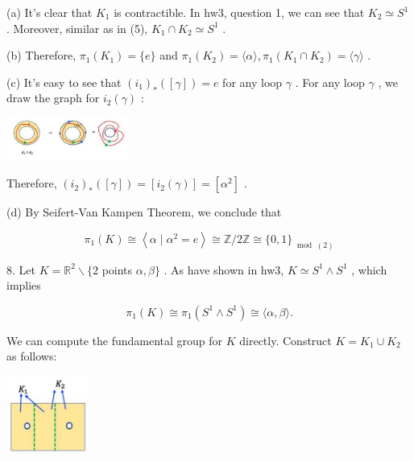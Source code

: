 (a) It’s clear that \({K}_{1}\) is contractible. In hw3, question 1, we can see that \({K}_{2} \simeq  {S}^{1}\) . Moreover, similar as in (5), \({K}_{1} \cap  {K}_{2} \simeq  {S}^{1}\) .

(b) Therefore, \({\pi }_{1}\left( {K}_{1}\right)  = \{ e\}\) and \({\pi }_{1}\left( {K}_{2}\right)  = \langle \alpha \rangle ,{\pi }_{1}\left( {{K}_{1} \cap  {K}_{2}}\right)  = \langle \gamma \rangle\) .

(c) It’s easy to see that \({\left( {i}_{1}\right) }_{ * }\left( \left\lbrack  \gamma \right\rbrack  \right)  = e\) for any loop \(\gamma\) . For any loop \(\gamma\) , we draw the graph for \({i}_{2}\left( \gamma \right)\) :

\begin{center}
\includegraphics[max width=0.3\textwidth]{images/bo_d2bcsrref24c73avs720_154_638_533_407_144_0.jpg}
\end{center}
\hspace*{3em} 

Therefore, \({\left( {i}_{2}\right) }_{ * }\left( \left\lbrack  \gamma \right\rbrack  \right)  = \left\lbrack  {{i}_{2}\left( \gamma \right) }\right\rbrack   = \left\lbrack  {\alpha }^{2}\right\rbrack\) .

(d) By Seifert-Van Kampen Theorem, we conclude that

\[
{\pi }_{1}\left( K\right)  \cong  \left\langle  {\alpha  \mid  {\alpha }^{2} = e}\right\rangle   \cong  \mathbb{Z}/2\mathbb{Z} \cong  \{ 0,1{\} }_{\;\operatorname{mod}\;\left( 2\right) }
\]

8. Let \(K = {\mathbb{R}}^{2} \smallsetminus  \{ 2\) points \(\alpha ,\beta \}\) . As have shown in hw3, \(K \simeq  {S}^{1} \land  {S}^{1}\) , which implies

\[
{\pi }_{1}\left( K\right)  \cong  {\pi }_{1}\left( {{S}^{1} \land  {S}^{1}}\right)  \cong  \langle \alpha ,\beta \rangle .
\]

We can compute the fundamental group for \(K\) directly. Construct \(K = {K}_{1} \cup  {K}_{2}\) as follows:

\begin{center}
\includegraphics[max width=0.2\textwidth]{images/bo_d2bcsrref24c73avs720_154_702_1411_226_219_0.jpg}
\end{center}
\hspace*{3em} 

